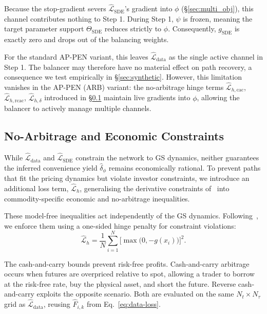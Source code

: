 \documentclass[sigconf, authorversion=true, nonacm=true]{acmart}
\begin{document}
Because the stop-gradient severs $\hat{\mathcal{L}}_{\text{SDE}}$'s gradient into $\phi$ (\S\ref{sec:multi_obj}), this channel contributes nothing to Step 1. During Step 1, $\psi$ is frozen, meaning the target parameter support $\Theta_{\text{SDE}}$ reduces strictly to $\phi$. Consequently, $g_{\text{SDE}}$ is exactly zero and drops out of the balancing weights.

For the standard AP-PEN variant, this leaves $\hat{\mathcal{L}}_{\text{data}}$ as the single active channel in Step 1. The balancer may therefore have no material effect on path recovery, a consequence we test empirically in \S\ref{sec:synthetic}. However, this limitation vanishes in the AP-PEN (ARB) variant: the no-arbitrage hinge terms $\hat{\mathcal{L}}_{h,\text{cac}}$, $\hat{\mathcal{L}}_{h,\text{rcac}}$, $\hat{\mathcal{L}}_{h,\delta}$ introduced in \S\ref{sec:constraints} maintain live gradients into $\phi$, allowing the balancer to actively manage multiple channels.

\subsection{No-Arbitrage and Economic Constraints}
\label{sec:constraints}
While $\hat{\mathcal{L}}_{\text{data}}$ and $\hat{\mathcal{L}}_{\text{SDE}}$ constrain the network to GS dynamics, neither guarantees the inferred convenience yield $\hat{\delta}_{\phi}$ remains economically rational. To prevent paths that fit the pricing dynamics but violate investor constraints, we introduce an additional loss term, $\hat{\mathcal{L}}_{h}$, generalising the derivative constraints of~\cite{Hoshisashi2024Physics-InformedPDEs} into commodity-specific economic and no-arbitrage inequalities.

These model-free inequalities act independently of the GS dynamics. Following~\cite{zhang2025exact}, we enforce them using a one-sided hinge penalty for constraint violations:
\begin{equation}
\hat{\mathcal{L}}_h = \frac{1}{N} \sum_{i=1}^{N}
\big[ \max\!\big(0, -g(x_i)\big) \big]^2.
\label{eq:hinge}
\end{equation}

The cash-and-carry bounds prevent risk-free profits. Cash-and-carry arbitrage occurs when futures are overpriced relative to spot, allowing a trader to borrow at the risk-free rate, buy the physical asset, and short the future. Reverse cash-and-carry exploits the opposite scenario. Both are evaluated on the same $N_t \times N_\tau$ grid as $\hat{\mathcal{L}}_{\text{data}}$, reusing $\hat{F}_{i,k}$ from Eq.~\ref{eq:data-loss}.
\end{document}
